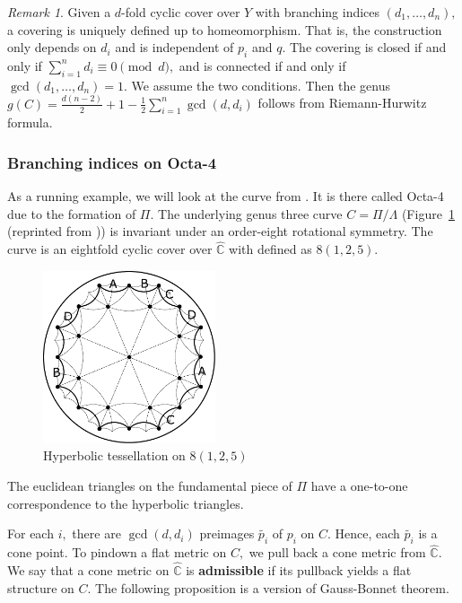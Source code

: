 \documentclass[12pt,reqno]{amsart}
\newcommand{\C}{\mathbb{C}}
\theoremstyle{definition}
\theoremstyle{remark}
\newtheorem*{remark}{Remark}
\begin{document}
\begin{remark} Given a $d$-fold cyclic cover over $Y$ with branching indices $(d_1, \ldots , d_n),$ a covering is uniquely defined up to homeomorphism. That is, the construction only depends on $d_i$ and is independent of $p_i$ and $q.$ The covering is closed if and only if $\sum\limits_{i=1}^n d_i \equiv 0 \pmod d,$ and is connected if and only if $\gcd (d_1, \ldots, d_n) = 1.$ We assume the two conditions. Then the genus $g(C) = \frac{d (n-2)}{2} + 1 - \frac{1}{2} \sum\limits_{i=1}^n \gcd(d,d_i)$ follows from Riemann-Hurwitz formula. 
\end{remark}

\subsubsection*{Branching indices on Octa-4}
As a running example, we will look at the curve from \cite{dami}. It is there called Octa-4 due to the formation of $\Pi.$ The underlying genus three curve $C = \Pi / \Lambda$ (Figure~\ref{fig:125} (reprinted from \cite{dami})) is invariant under an order-eight rotational symmetry. The curve is an eightfold cyclic cover over $\widehat{\C}$ with defined as $8 (1, 2, 5).$

\begin{figure}[htbp] %
   \centering
   \includegraphics[width=2in]{figures/125_base_.pdf} 
	\caption{Hyperbolic tessellation on $8(1, 2, 5)$}
	\label{fig:125}
\end{figure}

The euclidean triangles on the fundamental piece of $\Pi$ have a one-to-one correspondence to the hyperbolic triangles.

For each $i,$ there are $\gcd(d, d_i)$ preimages $\widetilde{p_i}$ of $p_i$ on $C.$ Hence, each $\widetilde{p_i}$ is a cone point. To pindown a flat metric on $C,$ we pull back a cone metric from $\widehat{\C}.$ We say that a cone metric on $\widehat{\C}$ is \textbf{admissible} if its pullback yields a flat structure on $C.$ The following proposition is a version of Gauss-Bonnet theorem.
\end{document}
